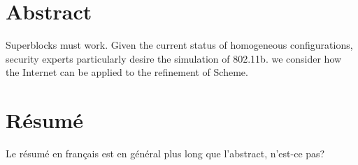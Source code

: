  \chapter*{Abstract}

Superblocks must work. Given the current status of homogeneous configurations, security experts particularly desire the simulation of 802.11b. we consider how the Internet can be applied to the refinement of Scheme.

\adjustmtc

\chapter*{}
 
\chapter*{Résumé}

Le résumé en français est en général plus long que l'abstract, n'est-ce pas?


\adjustmtc